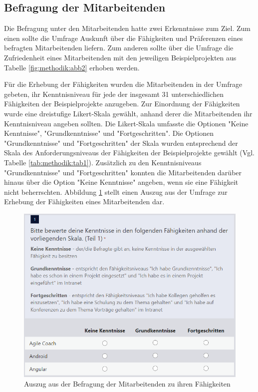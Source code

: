 \subsection{Befragung der Mitarbeitenden}
\label{ch:methodik:datenerhebung:1}
Die Befragung unter den Mitarbeitenden hatte zwei Erkenntnisse zum Ziel.
Zum einen sollte die Umfrage Auskunft über die Fähigkeiten und Präferenzen eines befragten Mitarbeitenden liefern.
Zum anderen sollte über die Umfrage die Zufriedenheit eines Mitarbeitenden mit den jeweiligen Beispielprojekten aus Tabelle \ref{fig:methodik:abb2} erhoben werden.

Für die Erhebung der Fähigkeiten wurden die Mitarbeitenden in der Umfrage gebeten, ihr Kenntnisniveau für jede der insgesamt 31 unterschiedlichen Fähigkeiten der Beispielprojekte anzugeben.
Zur Einordnung der Fähigkeiten wurde eine dreistufige Likert-Skala gewählt, anhand derer die Mitarbeitenden ihr Kenntnisniveau angeben sollten.
Die Likert-Skala umfasste die Optionen "Keine Kenntnisse", "Grundkenntnisse" und "Fortgeschritten".
Die Optionen "Grundkenntnisse" und "Fortgeschritten" der Skala wurden entsprechend der Skala des Anforderungsniveaus der Fähigkeiten der Beispielprojekte gewählt (Vgl. Tabelle \ref{tab:methodik:tab1}).
Zusätzlich zu den Kenntnisniveaus "Grundkenntnisse" und "Fortgeschritten" konnten die Mitarbeitenden darüber hinaus über die Option "Keine Kenntnisse" angeben, wenn sie eine Fähigkeit nicht beherrschten.
Abbildung \ref{fig:methodik:abb3} stellt einen Auszug aus der Umfrage zur Erhebung der Fähigkeiten eines Mitarbeitenden dar.

\begin{figure}[H]
    \centering
	\includegraphics[width=1\textwidth]{gfx/befragung-faehigkeiten.png}
	\caption[Auszug aus der Befragung der Mitarbeitenden zu ihren Fähigkeiten]{Auszug aus der Befragung der Mitarbeitenden zu ihren Fähigkeiten}
	\label{fig:methodik:abb3}
\end{figure}

